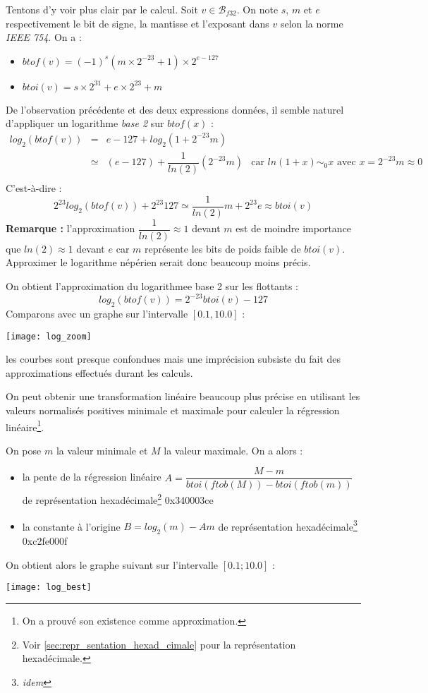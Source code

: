 \documentclass[../../main.tex]{subfiles}
\begin{document}
Tentons d'y voir plus clair par le calcul. Soit $v\in\mathcal{B}_{f32}$. On note $s$, $m$ et $e$ respectivement le bit de signe, la mantisse et l'exposant dans $v$ selon la norme \textit{IEEE 754}. On a :
\begin{itemize}
  \item $btof(v) = (-1)^{s}(m\times{2^{-23}} + 1)\times{2^{e-127}}$
  \item $btoi(v) = s\times{2^{31}} + e\times{2^23} + m$
\end{itemize}
De l'observation précédente et des deux expressions données, il semble naturel d'appliquer un logarithme \textit{base 2} sur $btof(x)$ :
$$\begin{array}{lcll}
log_2(btof(v)) & = & e - 127 + log_2\left(1 + 2^{-23}m\right) \\
& \simeq & (e - 127) + \dfrac{1}{ln(2)}\left(2^{-23}m\right) & \text{car $ln(1 + x)\sim_0 x$ avec $x = 2^{-23}m\approx{0}$} \\

\end{array}$$
C'est-à-dire :
$$2^{23}log_2(btof(v)) + 2^{23}127\simeq \dfrac{1}{ln(2)}m + 2^{23}e\approx{btoi(v)}$$
\textbf{Remarque :} l'approximation $\dfrac{1}{ln(2)}\approx 1$ devant $m$ est de moindre importance que $ln(2)\approx 1$ devant $e$ car $m$ représente les bits de poids faible de $btoi(v)$. Approximer le logarithme népérien serait donc beaucoup moins précis.

On obtient l'approximation du logarithmee base 2 sur les flottants :
$$log_2(btof(v)) = 2^{-23}btoi(v) - 127$$
Comparons avec un graphe sur l'intervalle $[0.1, 10.0]$ :
\begin{center}
  \texttt{[image: log\_zoom]}
\end{center}
les courbes sont presque confondues mais une imprécision subsiste du fait des approximations effectués durant les calculs. 

On peut obtenir une transformation linéaire beaucoup plus précise en utilisant les valeurs normalisés positives minimale et maximale pour calculer la régression linéaire\footnote{On a prouvé son existence comme approximation.}. 

On pose $m$ la valeur minimale et $M$ la valeur maximale. On a alors :
\begin{itemize}
  \item la pente de la régression linéaire $A = \dfrac{M - m}{btoi(ftob(M)) - btoi(ftob(m))}$ de représentation hexadécimale\footnote{Voir \ref{sec:repr_sentation_hexad_cimale} pour la représentation hexadécimale.} \textsf{0x340003ce}
  \item la constante à l'origine $B = log_2(m) - Am$ de représentation hexadécimale\footnote{\textit{idem}} \textsf{0xc2fe000f}
\end{itemize}
On obtient alors le graphe suivant sur l'intervalle $[0.1; 10.0]$ :
\begin{center}
  \texttt{[image: log\_best]}
\end{center}
\end{document}

